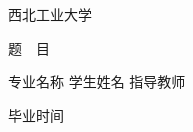 


\begin{titlepage}
\voffset 2.7cm
\begin{center}
\begin{center}
\begin{minipage}[c]{2.64cm}
\centering
\resizebox{!}{0.9cm}{%
\parbox{0.54cm}{}
}
\end{minipage}
\hskip 0.8cm
\begin{minipage}[c]{8cm}
\fontsize{33}{33} 西北工业大学
\end{minipage}
\end{center}
\vskip 0.7cm
\chuhao{}
\vskip 5cm

\sanhao{} 题~~目 \hspace{0.2cm} \underline{\makebox[12.5cm]{\nwpuTitleFirstLineString}}

\vskip 2cm
{
\sihao{} 专业名称  \underline{\makebox[7cm]{\nwpuMajorString}}
\vskip 0.7cm
\sihao{} 学生姓名  \underline{\makebox[7cm]{\nwpuAuthorString}}
\vskip 0.7cm
\sihao{} 指导教师  \underline{\makebox[7cm]{\nwpuSupervisorFirstString}}

\vskip 0.7cm

\sihao{} 毕业时间  \underline{\makebox[7cm]{\nwpuGraduateTimeString}}
\vfill
}
\end{center}
\end{titlepage}

\normalsize 
